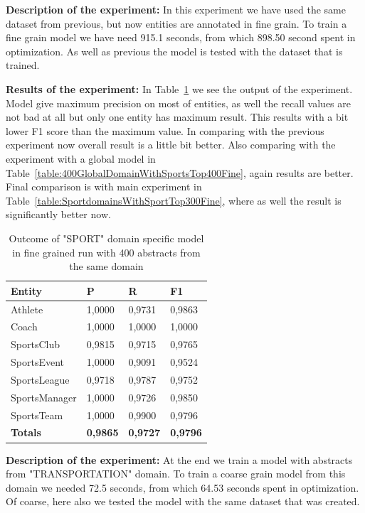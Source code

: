 \documentclass[thesis=M,english]{FITthesis}[2018/05/30]
\begin{document}
\textbf{Description of the experiment:} In this experiment we have used the same dataset from previous, but now entities are annotated in fine grain. To train a fine grain model we have need 915.1 seconds, from which 898.50 second spent in optimization. As well as previous the model is tested with the dataset that is trained.

\textbf{Results of the experiment:} In Table~\ref{table:400SportDomainWithSportTop400Fine} we see the output of the experiment. Model give maximum precision on most of entities, as well the recall values are not bad at all but only one entity has maximum result. This results with a bit lower F1 score than the maximum value. In comparing with the previous experiment now overall result is a little bit better. Also comparing with the experiment with a global model in Table~\ref{table:400GlobalDomainWithSportsTop400Fine}, again results are better. Final comparison is with main experiment in Table~\ref{table:SportdomainsWithSportTop300Fine}, where as well the result is significantly better now.

	\begin{table}[H]\centering
		\begin{tabular}{|l|l|l|l|}
			\hline {\textbf{Entity}} & {\textbf{P}} & {\textbf{R}} & {\textbf{F1}}\\\hline
				Athlete & 1,0000 & 0,9731 & 0,9863\\
				Coach & 1,0000 & 1,0000 & 1,0000\\
				SportsClub & 0,9815 & 0,9715 & 0,9765\\
				SportsEvent & 1,0000 & 0,9091 & 0,9524\\
				SportsLeague & 0,9718 & 0,9787 & 0,9752\\
				SportsManager & 1,0000 & 0,9726 & 0,9850\\				
				SportsTeam & 1,0000 & 0,9900 & 0,9796\\\hline
				\textbf{Totals} & \textbf{0,9865} & \textbf{0,9727} & \textbf{0,9796}\\\hline
		\end{tabular}
		\caption{Outcome of "SPORT" domain specific model in fine grained run with 400 abstracts from the same domain \label{table:400SportDomainWithSportTop400Fine}}
	\end{table}	

\textbf{Description of the experiment:} At the end we train a model with abstracts from "TRANSPORTATION" domain. To train a coarse grain model from this domain we needed 72.5 seconds, from which 64.53 seconds spent in optimization. Of coarse, here also we tested the model with the same dataset that was created. 
\end{document}
